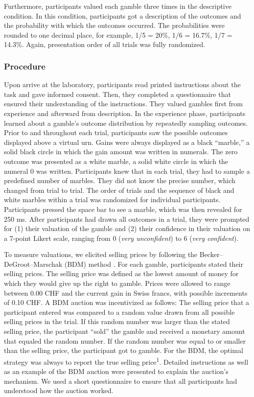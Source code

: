 \documentclass[a4paper,man, natbib]{apa6} %
\begin{document}
Furthermore, participants valued each gamble three times in the descriptive condition. In this condition, participants got a description of the outcomes and the probability with which the outcomes occurred. The probabilities were rounded to one decimal place, for example, 1/5 = 20\%, 1/6 = 16.7\%, 1/7 = 14.3\%. Again, presentation order of all trials was fully randomized.


\subsubsection{Procedure}
Upon arrive at the laboratory, participants read printed instructions about the task and gave informed consent. Then, they completed a questionnaire that ensured their understanding of the instructions. They valued gambles first from experience and afterward from description.
In the experience phase, participants learned about a gamble's outcome distribution by repeatedly sampling outcomes. Prior to and throughout each trial, participants saw the possible outcomes displayed above a virtual urn. Gains were always displayed as a black ``marble,'' a solid black circle in which the gain amount was written in numerals. The zero outcome was presented as a white marble, a solid white circle in which the numeral 0 was written. Participants knew that in each trial, they had to sample a predefined number of marbles. They did not know the precise number, which changed from trial to trial. The order of trials and the sequence of black and white marbles within a trial was randomized for individual participants. Participants pressed the space bar to see a marble, which was then revealed for 250 ms. After participants had drawn all outcomes in a trial, they were prompted for (1) their valuation of the gamble and (2) their confidence in their valuation on a 7-point Likert scale, ranging from 0 (\textit{very unconfident}) to 6 (\textit{very confident}).

To measure valuations, we elicited selling prices by following the Becker--DeGroot--Marschak (BDM) method \citep{Becker1964}. For each gamble, participants stated their selling prices. The selling price was defined as the lowest amount of money for which they would give up the right to gamble. Prices were allowed to range between 0.00 CHF and the current gain in Swiss francs, with possible increments of 0.10 CHF. A BDM auction was incentivized as follows: The selling price that a participant entered was compared to a random value drawn from all possible selling prices in the trial. If this random number was larger than the stated selling price, the participant ``sold'' the gamble and received a monetary amount that equaled the random number. If the random number was equal to or smaller than the selling price, the participant got to gamble. For the BDM, the optimal strategy was always to report the true selling price\textsuperscript{1}. %
Detailed instructions as well as an example of the BDM auction were presented to explain the auction's mechanism. We used a short questionnaire to ensure that all participants had understood how the auction worked.
\end{document}
